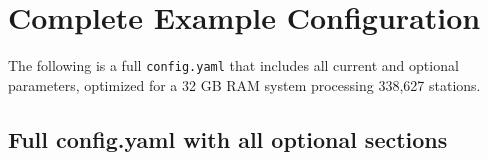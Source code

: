 \documentclass[12pt,a4paper]{article}
\begin{document}
\section{Complete Example Configuration}

The following is a full \texttt{config.yaml} that includes all current and optional parameters, optimized for a 32 GB RAM system processing 338,627 stations.

\subsection*{Full config.yaml with all optional sections}
\end{document}
